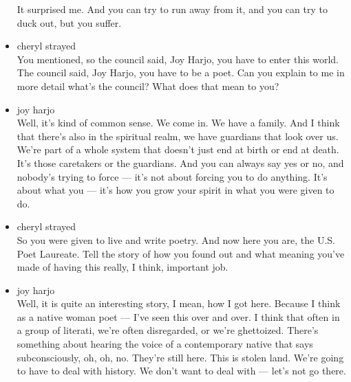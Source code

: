 \begin{itemize}
  It surprised me. And you can try to run away from it, and you can try
  to duck out, but you suffer.
\item
  cheryl strayed\\
  You mentioned, so the council said, Joy Harjo, you have to enter this
  world. The council said, Joy Harjo, you have to be a poet. Can you
  explain to me in more detail what's the council? What does that mean
  to you?
\item
  joy harjo\\
  Well, it's kind of common sense. We come in. We have a family. And I
  think that there's also in the spiritual realm, we have guardians that
  look over us. We're part of a whole system that doesn't just end at
  birth or end at death. It's those caretakers or the guardians. And you
  can always say yes or no, and nobody's trying to force --- it's not
  about forcing you to do anything. It's about what you --- it's how you
  grow your spirit in what you were given to do.
\item
  cheryl strayed\\
  So you were given to live and write poetry. And now here you are, the
  U.S. Poet Laureate. Tell the story of how you found out and what
  meaning you've made of having this really, I think, important job.
\item
  joy harjo\\
  Well, it is quite an interesting story, I mean, how I got here.
  Because I think as a native woman poet --- I've seen this over and
  over. I think that often in a group of literati, we're often
  disregarded, or we're ghettoized. There's something about hearing the
  voice of a contemporary native that says subconsciously, oh, oh, no.
  They're still here. This is stolen land. We're going to have to deal
  with history. We don't want to deal with --- let's not go there.


\end{itemize}
